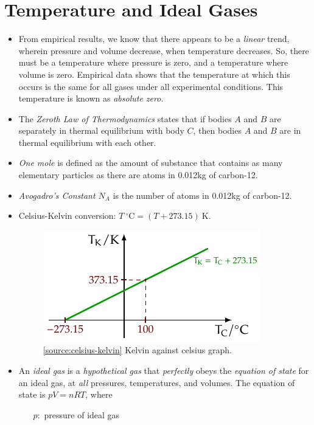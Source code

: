 \documentclass[oneside]{book}
\begin{document}
\chapter{Temperature and Ideal Gases}
\begin{itemize}
    \item From empirical results, we know that there appears to be a \emph{linear} trend, wherein pressure and volume decrease, when temperature decreases. So, there must be a temperature where pressure is zero, and a temperature where volume is zero. Empirical data shows that the temperature at which this occurs is the same for all gases under all experimental conditions. This temperature is known as \emph{absolute zero}.
    \item The \emph{Zeroth Law of Thermodynamics} states that if bodies \(A\) and \(B\) are separately in thermal equilibrium with body \(C\), then bodies \(A\) and \(B\) are in thermal equilibrium with each other.
    \item \emph{One mole} is defined as the amount of substance that contains as many elementary particles as there are atoms in 0.012kg of carbon-12.
    \item \emph{Avogadro's Constant \(N_A\)} is the number of atoms in 0.012kg of carbon-12.
    \item Celsius-Kelvin conversion: \(T\ {^\circ}\text{C}=(T+273.15)\ \text{K}\). 
    \begin{figure}[H]
        \centering
        \includegraphics{../images/Celcius-Kelvin/Celcius-Kelvin.pdf}
        \caption{\ref{source:celsius-kelvin} Kelvin against celsius graph.}
        \label{fig:celsius-kelvin}
    \end{figure}
    \item An \emph{ideal gas} is a \emph{hypothetical gas} that \emph{perfectly} obeys the \emph{equation of state} for an ideal gas, at \emph{all} pressures, temperatures, and volumes. The equation of state is \(pV=nRT\), where 
    \begin{enumerate}
        \item[\(p:\)] pressure of ideal gas

\end{enumerate}
\end{itemize}
\end{document}

